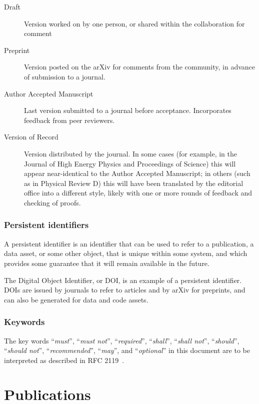 \documentclass{article}
\newcommand\rfcword[1]{\emph{#1}\xspace}
\newcommand\must{\rfcword{must}}
\newcommand\mustnot{\rfcword{must not}}
\newcommand\required{\rfcword{required}}
\newcommand\shall{\rfcword{shall}}
\newcommand\shallnot{\rfcword{shall not}}
\newcommand\should{\rfcword{should}}
\newcommand\shouldnot{\rfcword{should not}}
\newcommand\recommended{\rfcword{recommended}}
\newcommand\may{\rfcword{may}}
\newcommand\optional{\rfcword{optional}}
\begin{document}
\begin{description}
  \item[Draft]
        Version worked on by one person,
        or shared within the collaboration for comment
  \item[Preprint]
        Version posted on the arXiv for comments from the community,
        in advance of submission to a journal.
  \item[Author Accepted Manuscript]
        Last version submitted to a journal before acceptance.
        Incorporates feedback from peer reviewers.
  \item[Version of Record]
        Version distributed by the journal.
        In some cases
        (for example,
        in the Journal of High Energy Physics
        and Proceedings of Science)
        this will appear near-identical to the Author Accepted Manuscript;
        in others
        (such as in Physical Review D)
        this will have been
        translated by the editorial office into a different style,
        likely with one or more rounds of feedback
        and checking of proofs.
\end{description}

\subsubsection{Persistent identifiers}

A persistent identifier is
an identifier that can be used to refer to
a publication,
a data asset,
or some other object,
that is unique within some system,
and which provides some guarantee that it will remain available in the future.

The Digital Object Identifier,
or DOI,
is an example of a persistent identifier.
DOIs are issued by journals to refer to articles
and by arXiv for preprints,
and can also be generated for data and code assets.


\subsubsection{Keywords}

The key words
``\must'',
``\mustnot'',
``\required'',
``\shall'',
``\shallnot'',
``\should'',
``\shouldnot'',
``\recommended'',
``\may'',
and ``\optional''
in this document are to be interpreted as described in RFC 2119~\cite{rfc2119}.



\section{Publications}
\end{document}

